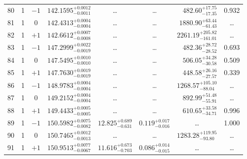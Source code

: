 \begin{table*}[!]
\begin{tabular}{llcrrlrc}
80 & 1 & $-1$ & $    142.1595_{-      0.0011}^{+      0.0012}$ & \multicolumn{1}{c}{\dots} & \multicolumn{1}{c}{\dots} & $      482.60_{-       17.35}^{+       17.75}$ & 0.932\\[1pt]
81 & 1 & 0 & $    142.4313_{-      0.0004}^{+      0.0004}$ & \multicolumn{1}{c}{\dots} & \multicolumn{1}{c}{\dots} & $     1880.90_{-       61.43}^{+       63.44}$ & \dots\\[1pt]
82 & 1 & $+1$ & $    142.6612_{-      0.0008}^{+      0.0007}$ & \multicolumn{1}{c}{\dots} & \multicolumn{1}{c}{\dots} & $     2261.19_{-      161.01}^{+      205.82}$ & \dots\\[1pt]

83 & 1 & $-1$ & $    147.2999_{-      0.0019}^{+      0.0022}$ & \multicolumn{1}{c}{\dots} & \multicolumn{1}{c}{\dots} & $      482.36_{-       28.52}^{+       28.72}$ & 0.693\\[1pt]
84 & 1 & 0 & $    147.5495_{-      0.0010}^{+      0.0010}$ & \multicolumn{1}{c}{\dots} & \multicolumn{1}{c}{\dots} & $      506.05_{-       30.58}^{+       34.28}$ & 0.509\\[1pt]
85 & 1 & $+1$ & $    147.7630_{-      0.0019}^{+      0.0019}$ & \multicolumn{1}{c}{\dots} & \multicolumn{1}{c}{\dots} & $      448.58_{-       27.57}^{+       26.16}$ & 0.339\\[1pt]
86 & 1 & $-1$ & $    148.9783_{-      0.0004}^{+      0.0004}$ & \multicolumn{1}{c}{\dots} & \multicolumn{1}{c}{\dots} & $     1268.57_{-       88.04}^{+      105.10}$ & \dots\\[1pt]
87 & 1 & 0 & $    149.2152_{-      0.0004}^{+      0.0004}$ & \multicolumn{1}{c}{\dots} & \multicolumn{1}{c}{\dots} & $      892.99_{-       55.91}^{+       51.48}$ & \dots \\[1pt]
88 & 1 & $+1$ & $    149.4433_{-      0.0005}^{+      0.0005}$ & \multicolumn{1}{c}{\dots} & \multicolumn{1}{c}{\dots} & $      610.65_{-       34.71}^{+       33.58}$ & 0.996\\[1pt]
89 & 1 & $-1$ & $    150.5982_{-      0.0082}^{+      0.0075}$ & $      12.825_{-       0.631}^{+       0.689}$ & $       0.119_{-       0.016}^{+       0.017}$ & \multicolumn{1}{c}{\dots} & 1.000\\[1pt]
90 & 1 & 0 & $    150.7465_{-      0.0013}^{+      0.0012}$ & \multicolumn{1}{c}{\dots} & \multicolumn{1}{c}{\dots} & $     1283.28_{-       93.80}^{+      119.95}$ & \dots\\[1pt]
91 & 1 & $+1$ & $    150.9513_{-      0.0067}^{+      0.0077}$ & $      11.616_{-       0.703}^{+       0.673}$ & $       0.086_{-       0.015}^{+       0.014}$ & \multicolumn{1}{c}{\dots} & \dots\\[1pt]

\end{tabular}
\end{table*}
